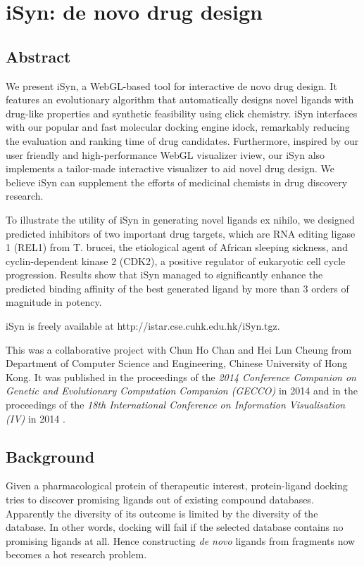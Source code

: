 \chapter{iSyn: de novo drug design}

\section{Abstract}

We present iSyn, a WebGL-based tool for interactive de novo drug design. It features an evolutionary algorithm that automatically designs novel ligands with drug-like properties and synthetic feasibility using click chemistry. iSyn interfaces with our popular and fast molecular docking engine idock, remarkably reducing the evaluation and ranking time of drug candidates. Furthermore, inspired by our user friendly and high-performance WebGL visualizer iview, our iSyn also implements a tailor-made interactive visualizer to aid novel drug design. We believe iSyn can supplement the efforts of medicinal chemists in drug discovery research.

To illustrate the utility of iSyn in generating novel ligands ex nihilo, we designed predicted inhibitors of two important drug targets, which are RNA editing ligase 1 (REL1) from T. brucei, the etiological agent of African sleeping sickness, and cyclin-dependent kinase 2 (CDK2), a positive regulator of eukaryotic cell cycle progression. Results show that iSyn managed to significantly enhance the predicted binding affinity of the best generated ligand by more than 3 orders of magnitude in potency.

iSyn is freely available at http://istar.cse.cuhk.edu.hk/iSyn.tgz.

This was a collaborative project with Chun Ho Chan and Hei Lun Cheung from Department of Computer Science and Engineering, Chinese University of Hong Kong. It was published in the proceedings of the \textit{2014 Conference Companion on Genetic and Evolutionary Computation Companion (GECCO)} in 2014 \citep{1409} and in the proceedings of the \textit{18th International Conference on Information Visualisation (IV)} in 2014 \citep{1387}.

\section{Background}

Given a pharmacological protein of therapeutic interest, protein-ligand docking tries to discover promising ligands out of existing compound databases. Apparently the diversity of its outcome is limited by the diversity of the database. In other words, docking will fail if the selected database contains no promising ligands at all. Hence constructing \textit{de novo} ligands from fragments now becomes a hot research problem.

